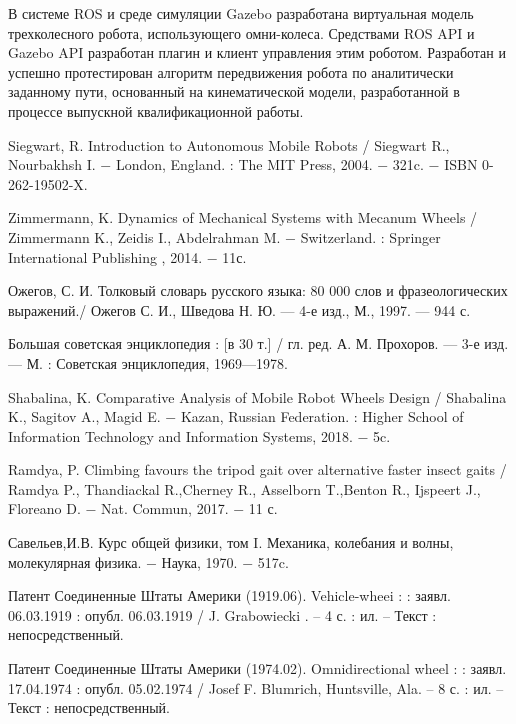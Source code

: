 \documentclass[oneside,final,14pt]{extreport}
\begin{document}
В системе ROS и  среде симуляции Gazebo разработана виртуальная модель трехколесного робота, использующего омни-колеса. Средствами ROS API и Gazebo API разработан плагин и клиент управления этим роботом. Разработан и успешно протестирован алгоритм передвижения робота по аналитически заданному пути, основанный на кинематической модели, разработанной в процессе выпускной квалификационной  работы.
\newpage
\begin{thebibliography}{0}

Siegwart, R.
Introduction to Autonomous Mobile Robots / Siegwart R.,  Nourbakhsh I.
$-$ London, England.
: The MIT Press, 2004. $-$ 321c. $-$ ISBN 0-262-19502-X.

Zimmermann, K.
Dynamics of Mechanical Systems
with Mecanum Wheels / Zimmermann K., Zeidis I., Abdelrahman M.
$-$ Switzerland. : Springer International Publishing , 2014. $-$ 11с.

Ожегов, С. И. Толковый словарь русского языка: 80 000 слов и фразеологических выражений./ Ожегов С. И., Шведова Н. Ю. — 4-е изд., М., 1997. — 944 с.


Большая советская энциклопедия : [в 30 т.] / гл. ред. А. М. Прохоров. — 3-е изд. — М. : Советская энциклопедия, 1969—1978.

Shabalina, K.
Comparative Analysis of Mobile Robot Wheels
Design
/
Shabalina K., Sagitov A., Magid E.
$-$  Kazan, Russian Federation. : Higher School of Information Technology and Information Systems,
 2018. $-$ 5c.

 Ramdya, P.
Climbing favours the tripod gait over alternative
faster insect gaits
/
 Ramdya P., Thandiackal R.,Cherney R., Asselborn T.,Benton R.,
 Ijspeert J., Floreano D.
$-$ Nat. Commun, 2017. $-$  11 с.

Савельев,И.В.
Курс общей физики, том I.
Механика, колебания и волны, молекулярная физика.
$-$ Наука, 1970. $-$ 517c.

Патент  Соединенные Штаты Америки (1919.06). Vehicle-wheei :  : заявл. 06.03.1919 : опубл. 06.03.1919 / J. Grabowiecki . – 4 с. : ил. – Текст : непосредственный.

Патент  Соединенные Штаты Америки (1974.02). Omnidirectional wheel :  : заявл. 17.04.1974 : опубл. 05.02.1974 / Josef F. Blumrich, Huntsville, Ala. – 8 с. : ил. – Текст : непосредственный.



\end{thebibliography}
\end{document}
